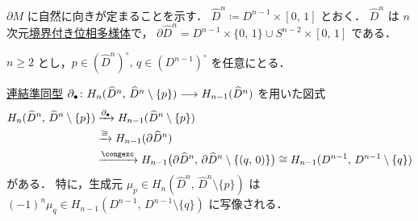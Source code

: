 \documentclass[algtopo_main]{subfiles}
\begin{document}
$\partial M$ に自然に向きが定まることを示す．
$\widehat{D}^n \coloneqq D^{n-1} \times [0,\, 1]$ とおく．
$\widehat{D}^n$ は $n$ 次元\hyperref[def:mani-with-boundary]{境界付き位相多様体}で，
$\partial \widehat{D}^n = D^{n-1} \times \{0,\, 1\} \cup S^{n-2} \times [0,\, 1]$ である．
\begin{mylem}[label=lem:induced-orientation-1]{}
    $n \ge 2$  とし，$p \in (\widehat{D}^n)^\circ,\, q \in (D^{n-1})^\circ$ を任意にとる．

    \hyperref[lem:preconne]{連結準同型} $\partial_\bullet \colon H_n (\widehat{D}^n,\, \widehat{D}^n \setminus \{p\}) \longrightarrow H_{n-1} (\widehat{D}^n)$ を用いた図式
    \begin{align}
        H_n (\widehat{D}^n,\, \widehat{D}^n \setminus \{p\})  &\xrightarrow{\partial_\bullet} H_{n-1} (\widehat{D}^n \setminus \{p\}) \\
        &\xrightarrow{\cong} H_{n-1}(\partial \widehat{D}^n) \\
        &\xrightarrow{\congexc}  H_{n-1} \bigl( \partial \widehat{D}^n,\, \partial \widehat{D}^n \setminus \{(q,\, 0)\} \bigr) \cong H_{n-1} (D^{n-1},\, D^{n-1} \setminus \{q\})
    \end{align}
    がある．
    特に，生成元 $\mu_p \in H_n (\widehat{D}^n,\, \widehat{D}^n \setminus \{p\})$ は
    $(-1)^n \mu_q \in H_{n-1} (D^{n-1},\, D^{n-1}\setminus \{q\})$ に写像される．
\end{mylem}
\end{document}
